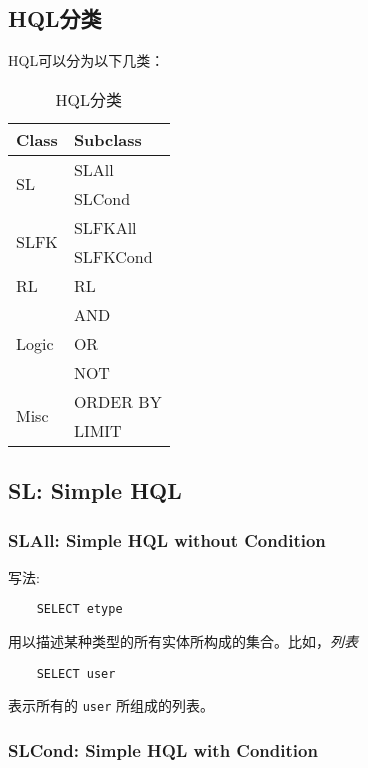 \documentclass[10pt,a4paper]{article}
\begin{document}
\begin{CJK}{UTF8}{gbsn}
  \section{HQL分类}
  HQL可以分为以下几类：
  \begin{table}[htbp]
    \centering
    \caption{HQL分类}
    \begin{tabular}{p{30pt}p{100pt}}
      \toprule
      Class & Subclass \\
      \midrule
      \multirow{2}{*}{SL} & SLAll \\
      & SLCond \\
      \cmidrule{2-2}
      \multirow{2}{*}{SLFK} & SLFKAll \\
      & SLFKCond \\
      \cmidrule{2-2}
      RL & RL \\
      \cmidrule{2-2}
      \multirow{3}{*}{Logic} & AND \\
      & OR \\
      & NOT \\
      \cmidrule{2-2}
      \multirow{2}{*}{Misc} & ORDER BY \\
      & LIMIT \\
      \bottomrule
    \end{tabular}
  \end{table}

  \subsection{SL: Simple HQL}

  \subsubsection{SLAll: Simple HQL without Condition}
  写法:
\begin{verbatim}
    SELECT etype
\end{verbatim}
  用以描述某种类型的所有实体所构成的集合。比如，\emph{列表}
\begin{verbatim}
    SELECT user
\end{verbatim}
  表示所有的 \texttt{user} 所组成的列表。

  \subsubsection{SLCond: Simple HQL with Condition}


\end{CJK}
\end{document}
